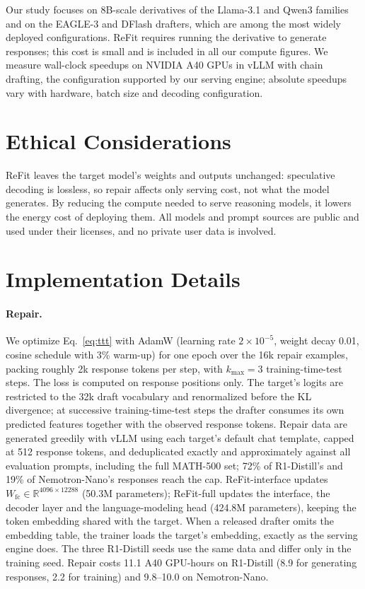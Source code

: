 \documentclass[11pt]{article}
\newcommand{\refit}{ReFit}
\newcommand{\refitI}{ReFit-interface}
\newcommand{\refitF}{ReFit-full}
\begin{document}
Our study focuses on 8B-scale derivatives of the Llama-3.1 and Qwen3 families and on the EAGLE-3 and DFlash drafters, which are among the most widely deployed configurations.
\refit{} requires running the derivative to generate responses; this cost is small and is included in all our compute figures.
We measure wall-clock speedups on NVIDIA A40 GPUs in vLLM with chain drafting, the configuration supported by our serving engine; absolute speedups vary with hardware, batch size and decoding configuration.

\section*{Ethical Considerations}

\refit{} leaves the target model's weights and outputs unchanged: speculative decoding is lossless, so repair affects only serving cost, not what the model generates.
By reducing the compute needed to serve reasoning models, it lowers the energy cost of deploying them.
All models and prompt sources are public and used under their licenses, and no private user data is involved.



\appendix

\section{Implementation Details}
\label{app:details}

\paragraph{Repair.}
We optimize Eq.~\eqref{eq:ttt} with AdamW (learning rate $2\times10^{-5}$, weight decay 0.01, cosine schedule with 3\% warm-up) for one epoch over the 16k repair examples, packing roughly 2k response tokens per step, with $k_{\max}{=}3$ training-time-test steps.
The loss is computed on response positions only.
The target's logits are restricted to the 32k draft vocabulary and renormalized before the KL divergence; at successive training-time-test steps the drafter consumes its own predicted features together with the observed response tokens.
Repair data are generated greedily with vLLM using each target's default chat template, capped at 512 response tokens, and deduplicated exactly and approximately against all evaluation prompts, including the full MATH-500 set; 72\% of R1-Distill's and 19\% of Nemotron-Nano's responses reach the cap.
\refitI{} updates $W_{\text{fc}} \in \mathbb{R}^{4096 \times 12288}$ (50.3M parameters); \refitF{} updates the interface, the decoder layer and the language-modeling head (424.8M parameters), keeping the token embedding shared with the target.
When a released drafter omits the embedding table, the trainer loads the target's embedding, exactly as the serving engine does.
The three R1-Distill seeds use the same data and differ only in the training seed.
Repair costs 11.1 A40 GPU-hours on R1-Distill (8.9 for generating responses, 2.2 for training) and 9.8--10.0 on Nemotron-Nano.
\end{document}
